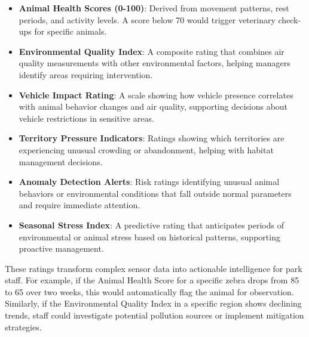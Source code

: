 \begin{itemize}
  \item \textbf{Animal Health Scores (0-100)}: Derived from movement patterns, rest periods, and activity levels. A score below 70 would trigger veterinary check-ups for specific animals.
  
  \item \textbf{Environmental Quality Index}: A composite rating that combines air quality measurements with other environmental factors, helping managers identify areas requiring intervention.
  
  \item \textbf{Vehicle Impact Rating}: A scale showing how vehicle presence correlates with animal behavior changes and air quality, supporting decisions about vehicle restrictions in sensitive areas.
  
  \item \textbf{Territory Pressure Indicators}: Ratings showing which territories are experiencing unusual crowding or abandonment, helping with habitat management decisions.
  
  \item \textbf{Anomaly Detection Alerts}: Risk ratings identifying unusual animal behaviors or environmental conditions that fall outside normal parameters and require immediate attention.
  
  \item \textbf{Seasonal Stress Index}: A predictive rating that anticipates periods of environmental or animal stress based on historical patterns, supporting proactive management.
\end{itemize}

These ratings transform complex sensor data into actionable intelligence for park staff. For example, if the Animal Health Score for a specific zebra drops from 85 to 65 over two weeks, this would automatically flag the animal for observation. Similarly, if the Environmental Quality Index in a specific region shows declining trends, staff could investigate potential pollution sources or implement mitigation strategies.


